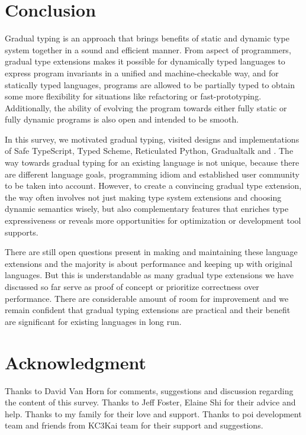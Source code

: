 \section{Conclusion}

Gradual typing is an approach that brings benefits of static and dynamic type system
together in a sound and efficient manner.
From aspect of programmers, gradual type extensions makes it possible
for dynamically typed languages
to express program invariants in a unified and machine-checkable way,
and for statically typed languages,
programs are allowed to be partially typed to obtain some more flexibility
for situations like refactoring or fast-prototyping.
Additionally, the ability of evolving the program towards
either fully static or fully dynamic programs is also open and intended to be smooth.

In this survey, we motivated gradual typing, visited designs and implementations of Safe TypeScript,
Typed Scheme, Reticulated Python, Gradualtalk and \csharp.
The way towards gradual typing for an existing language is not unique,
because there are different language goals, programming idiom and established user community
to be taken into account.
However, to create a convincing gradual type extension, the way often involves 
not just making type system extensions and choosing dynamic semantics wisely,
but also complementary features that enriches type expressiveness or
reveals more opportunities for optimization or development tool supports.

There are still open questions present in making and maintaining these language extensions and
the majority is about performance and keeping up with original languages.
But this is understandable as many gradual type extensions we have discussed so far
serve as proof of concept or prioritize correctness over performance.
There are considerable amount of room for improvement and we remain confident that
gradual typing extensions are practical and their benefit are significant for existing languages in long run.

\section*{Acknowledgment}

Thanks to David Van Horn for comments, suggestions and discussion regarding
the content of this survey.
Thanks to Jeff Foster, Elaine Shi for their advice and help.
Thanks to my family for their love and support.
Thanks to poi development team and friends from KC3Kai team for
their support and suggestions.

